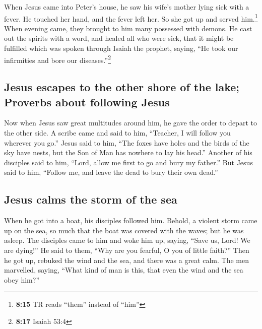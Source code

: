  When Jesus came into Peter's house, he saw his wife's
mother lying sick with a fever.  He touched her hand, and
the fever left her. So she got up and served him.\footnote{\textbf{8:15}
  TR reads ``them'' instead of ``him''}  When evening
came, they brought to him many possessed with demons. He cast out the
spirits with a word, and healed all who were sick,  that
it might be fulfilled which was spoken through Isaiah the prophet,
saying, ``He took our infirmities and bore our diseases.''\footnote{\textbf{8:17}
  Isaiah 53:4}

\hypertarget{jesus-escapes-to-the-other-shore-of-the-lake-proverbs-about-following-jesus}{%
\subsection{Jesus escapes to the other shore of the lake; Proverbs about
following
Jesus}\label{jesus-escapes-to-the-other-shore-of-the-lake-proverbs-about-following-jesus}}

 Now when Jesus saw great multitudes around him, he gave
the order to depart to the other side.  A scribe came and
said to him, ``Teacher, I will follow you wherever you go.''
 Jesus said to him, ``The foxes have holes and the birds
of the sky have nests, but the Son of Man has nowhere to lay his head.''
 Another of his disciples said to him, ``Lord, allow me
first to go and bury my father.''  But Jesus said to him,
``Follow me, and leave the dead to bury their own dead.''

\hypertarget{jesus-calms-the-storm-of-the-sea}{%
\subsection{Jesus calms the storm of the
sea}\label{jesus-calms-the-storm-of-the-sea}}

 When he got into a boat, his disciples followed him.
 Behold, a violent storm came up on the sea, so much that
the boat was covered with the waves; but he was asleep. 
The disciples came to him and woke him up, saying, ``Save us, Lord! We
are dying!''  He said to them, ``Why are you fearful, O
you of little faith?'' Then he got up, rebuked the wind and the sea, and
there was a great calm.  The men marvelled, saying,
``What kind of man is this, that even the wind and the sea obey him?''


